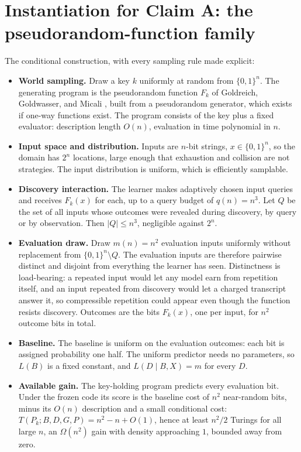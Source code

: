 \documentclass[11pt]{article}
\begin{document}
\section{Instantiation for Claim A: the pseudorandom-function family}
\label{app:claimA}

The conditional construction, with every sampling rule made explicit:

\begin{itemize}
\item \textbf{World sampling.} Draw a key $k$ uniformly at random from $\{0,1\}^n$. The generating program is the pseudorandom function $F_k$ of Goldreich, Goldwasser, and Micali \cite{ggm1986}, built from a pseudorandom generator, which exists if one-way functions exist. The program consists of the key plus a fixed evaluator: description length $O(n)$, evaluation in time polynomial in $n$.
\item \textbf{Input space and distribution.} Inputs are $n$-bit strings, $x \in \{0,1\}^n$, so the domain has $2^n$ locations, large enough that exhaustion and collision are not strategies. The input distribution is uniform, which is efficiently samplable.
\item \textbf{Discovery interaction.} The learner makes adaptively chosen input queries and receives $F_k(x)$ for each, up to a query budget of $q(n) = n^3$. Let $Q$ be the set of all inputs whose outcomes were revealed during discovery, by query or by observation. Then $|Q| \le n^3$, negligible against $2^n$.
\item \textbf{Evaluation draw.} Draw $m(n) = n^2$ evaluation inputs uniformly without replacement from $\{0,1\}^n \setminus Q$. The evaluation inputs are therefore pairwise distinct and disjoint from everything the learner has seen. Distinctness is load-bearing: a repeated input would let any model earn from repetition itself, and an input repeated from discovery would let a charged transcript answer it, so compressible repetition could appear even though the function resists discovery. Outcomes are the bits $F_k(x)$, one per input, for $n^2$ outcome bits in total.
\item \textbf{Baseline.} The baseline is uniform on the evaluation outcomes: each bit is assigned probability one half. The uniform predictor needs no parameters, so $L(B)$ is a fixed constant, and $L(D \mid B, X) = m$ for every $D$.
\item \textbf{Available gain.} The key-holding program predicts every evaluation bit. Under the frozen code its score is the baseline cost of $n^2$ near-random bits, minus its $O(n)$ description and a small conditional cost: $T(P_k;B,D,G,P) = n^2 - n + O(1)$, hence at least $n^2/2$ Turings for all large $n$, an $\Omega(n^2)$ gain with density approaching $1$, bounded away from zero.

\end{itemize}
\end{document}
